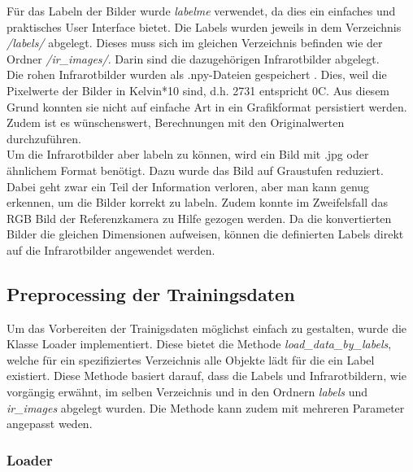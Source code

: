 Für das Labeln der Bilder wurde \textit{labelme} \parencite{labelme2016} verwendet, da dies ein einfaches und praktisches User Interface bietet. Die Labels wurden jeweils in dem Verzeichnis \textit{/labels/} abgelegt. Dieses muss sich im gleichen Verzeichnis befinden wie der Ordner \textit{/ir\_images/}. Darin sind die dazugehörigen Infrarotbilder abgelegt.\\
Die rohen Infrarotbilder wurden als .npy-Dateien gespeichert \parencite{npyformat}. Dies, weil die Pixelwerte der Bilder in Kelvin*10 sind, d.h. 2731 entspricht 0\degree C. Aus diesem Grund konnten sie nicht auf einfache Art in ein Grafikformat persistiert werden. Zudem ist es wünschenswert, Berechnungen mit den Originalwerten durchzuführen.\\
Um die Infrarotbilder aber labeln zu können, wird ein Bild mit .jpg oder ähnlichem Format benötigt. Dazu wurde das Bild auf Graustufen reduziert. Dabei geht zwar ein Teil der Information verloren, aber man kann genug erkennen, um die Bilder korrekt zu labeln. Zudem konnte im Zweifelsfall das RGB Bild der Referenzkamera zu Hilfe gezogen werden. Da die konvertierten Bilder die gleichen Dimensionen aufweisen, können die definierten Labels direkt auf die Infrarotbilder angewendet werden.

\subsection{Preprocessing der Trainingsdaten}

Um das Vorbereiten der Trainigsdaten möglichst einfach zu gestalten, wurde die Klasse Loader implementiert. Diese bietet die Methode \textit{load\_data\_by\_labels}, welche für ein spezifiziertes Verzeichnis alle Objekte lädt für die ein Label existiert. Diese Methode basiert darauf, dass die Labels und Infrarotbildern, wie vorgängig erwähnt, im selben Verzeichnis und in den Ordnern \textit{labels} und \textit{ir\_images} abgelegt wurden. Die Methode kann zudem mit mehreren Parameter angepasst weden.

\subsubsection{Loader}


